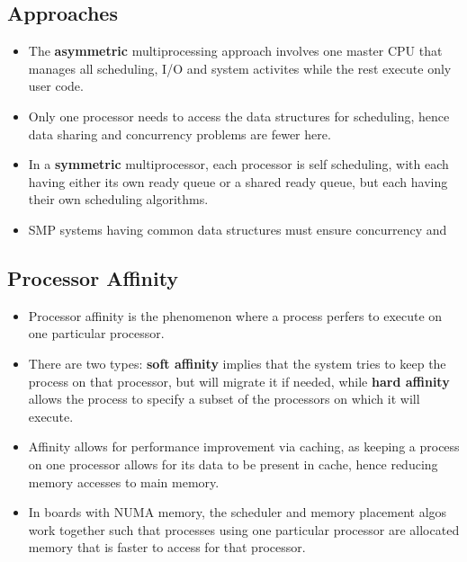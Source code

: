 \documentclass{article}
\theoremstyle{plain}
\theoremstyle{definition}
\begin{document}
\subsection{Approaches}
\begin{itemize}
    \item The \textbf{asymmetric} multiprocessing approach involves one master CPU that manages all scheduling, I/O and system activites while the rest execute only user code.
    
    \item Only one processor needs to access the data structures for scheduling, hence data sharing and concurrency problems are fewer here. 
    
    \item In a \textbf{symmetric} multiprocessor, each processor is self scheduling, with each having either its own ready queue or a shared ready queue, but each having their own scheduling algorithms. 
    
    \item SMP systems having common data structures must ensure concurrency and 
\end{itemize}
\subsection{Processor Affinity}
\begin{itemize}
    \item Processor affinity is the phenomenon where a process perfers to execute on one particular processor. 
    
    \item There are two types: \textbf{soft affinity} implies that the system tries to keep the process on that processor, but will migrate it if needed, while \textbf{hard affinity} allows the process to specify a subset of the processors on which it will execute. 
    
    \item Affinity allows for performance improvement via caching, as keeping a process on one processor allows for its data to be present in cache, hence reducing memory accesses to main memory. 
    
    \item In boards with NUMA memory, the scheduler and memory placement algos work together such that processes using one particular processor are allocated memory that is faster to access for that processor. 
\end{itemize}
\end{document}
